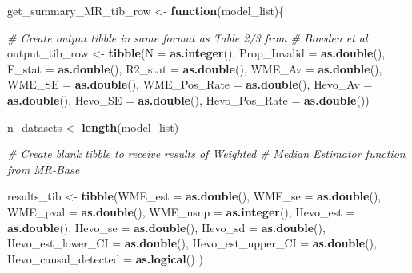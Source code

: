 \documentclass[
]{article}
\newenvironment{Shaded}{\begin{snugshade}}{\end{snugshade}}
\newcommand{\AttributeTok}[1]{\textcolor[rgb]{0.13,0.29,0.53}{#1}}
\newcommand{\CommentTok}[1]{\textcolor[rgb]{0.56,0.35,0.01}{\textit{#1}}}
\newcommand{\ControlFlowTok}[1]{\textcolor[rgb]{0.13,0.29,0.53}{\textbf{#1}}}
\newcommand{\FunctionTok}[1]{\textcolor[rgb]{0.13,0.29,0.53}{\textbf{#1}}}
\newcommand{\NormalTok}[1]{#1}
\newcommand{\OtherTok}[1]{\textcolor[rgb]{0.56,0.35,0.01}{#1}}
\begin{document}
\begin{Shaded}
\begin{Highlighting}[]
\NormalTok{get\_summary\_MR\_tib\_row }\OtherTok{\textless{}{-}} \ControlFlowTok{function}\NormalTok{(model\_list)\{}
  
  
  \CommentTok{\# Create output tibble in same format as Table 2/3 from}
  \CommentTok{\# Bowden et al}
\NormalTok{  output\_tib\_row }\OtherTok{\textless{}{-}} \FunctionTok{tibble}\NormalTok{(}\AttributeTok{N =} \FunctionTok{as.integer}\NormalTok{(),}
                           \AttributeTok{Prop\_Invalid =} \FunctionTok{as.double}\NormalTok{(),}
                           \AttributeTok{F\_stat =} \FunctionTok{as.double}\NormalTok{(),}
                           \AttributeTok{R2\_stat =} \FunctionTok{as.double}\NormalTok{(),}
                           \AttributeTok{WME\_Av =} \FunctionTok{as.double}\NormalTok{(),}
                           \AttributeTok{WME\_SE =} \FunctionTok{as.double}\NormalTok{(),}
                           \AttributeTok{WME\_Pos\_Rate =} \FunctionTok{as.double}\NormalTok{(),}
                           \AttributeTok{Hevo\_Av =} \FunctionTok{as.double}\NormalTok{(),}
                           \AttributeTok{Hevo\_SE =} \FunctionTok{as.double}\NormalTok{(),}
                           \AttributeTok{Hevo\_Pos\_Rate =} \FunctionTok{as.double}\NormalTok{())}
  
\NormalTok{  n\_datasets }\OtherTok{\textless{}{-}} \FunctionTok{length}\NormalTok{(model\_list)}
  
  \CommentTok{\# Create blank tibble to receive results of Weighted}
  \CommentTok{\# Median Estimator function from MR{-}Base}
  
\NormalTok{  results\_tib }\OtherTok{\textless{}{-}}  \FunctionTok{tibble}\NormalTok{(}\AttributeTok{WME\_est =} \FunctionTok{as.double}\NormalTok{(),}
                         \AttributeTok{WME\_se =} \FunctionTok{as.double}\NormalTok{(),}
                         \AttributeTok{WME\_pval =} \FunctionTok{as.double}\NormalTok{(),}
                         \AttributeTok{WME\_nsnp =} \FunctionTok{as.integer}\NormalTok{(),}
                         \AttributeTok{Hevo\_est =} \FunctionTok{as.double}\NormalTok{(),}
                         \AttributeTok{Hevo\_se =} \FunctionTok{as.double}\NormalTok{(),}
                         \AttributeTok{Hevo\_sd =} \FunctionTok{as.double}\NormalTok{(),}
                         \AttributeTok{Hevo\_est\_lower\_CI =} \FunctionTok{as.double}\NormalTok{(),}
                         \AttributeTok{Hevo\_est\_upper\_CI =} \FunctionTok{as.double}\NormalTok{(),}
                         \AttributeTok{Hevo\_causal\_detected =} \FunctionTok{as.logical}\NormalTok{()}
\NormalTok{  )}
  

\end{Highlighting}
\end{Shaded}
\end{document}
